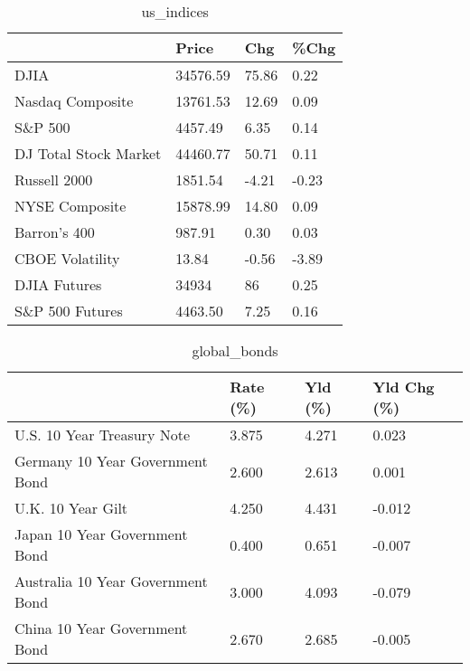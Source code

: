 \documentclass{article}%
\begin{document}
%


\begin{table}[htbp]%
\caption{us\_indices}%
\centering%
\begin{adjustbox}{width=1\textwidth}%
\begin{tabular}{llll}
\toprule
                      &    Price &   Chg &  \%Chg \\
\midrule
                 DJIA & 34576.59 & 75.86 &  0.22 \\
     Nasdaq Composite & 13761.53 & 12.69 &  0.09 \\
              S\&P 500 &  4457.49 &  6.35 &  0.14 \\
DJ Total Stock Market & 44460.77 & 50.71 &  0.11 \\
         Russell 2000 &  1851.54 & -4.21 & -0.23 \\
       NYSE Composite & 15878.99 & 14.80 &  0.09 \\
         Barron's 400 &   987.91 &  0.30 &  0.03 \\
      CBOE Volatility &    13.84 & -0.56 & -3.89 \\
         DJIA Futures &    34934 &    86 &  0.25 \\
      S\&P 500 Futures &  4463.50 &  7.25 &  0.16 \\
\bottomrule
\end{tabular}
%
\end{adjustbox}%
\end{table}

%


\begin{table}[htbp]%
\caption{global\_bonds}%
\centering%
\begin{adjustbox}{width=1\textwidth}%
\begin{tabular}{llll}
\toprule
                                  & Rate (\%) & Yld (\%) & Yld Chg (\%) \\
\midrule
       U.S. 10 Year Treasury Note &    3.875 &   4.271 &       0.023 \\
  Germany 10 Year Government Bond &    2.600 &   2.613 &       0.001 \\
                U.K. 10 Year Gilt &    4.250 &   4.431 &      -0.012 \\
    Japan 10 Year Government Bond &    0.400 &   0.651 &      -0.007 \\
Australia 10 Year Government Bond &    3.000 &   4.093 &      -0.079 \\
    China 10 Year Government Bond &    2.670 &   2.685 &      -0.005 \\
\bottomrule
\end{tabular}
%
\end{adjustbox}%
\end{table}
\end{document}
